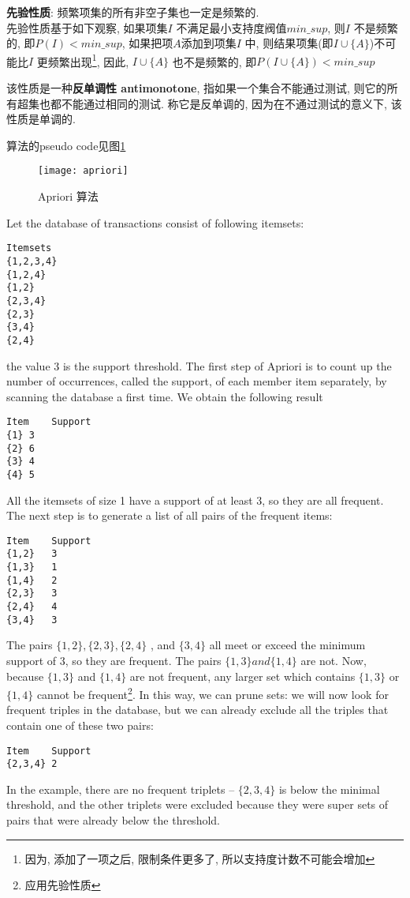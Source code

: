 \documentclass{article}
\begin{document}
\textbf{先验性质}: 频繁项集的所有非空子集也一定是频繁的.\\
先验性质基于如下观察, 如果项集$I$ 不满足最小支持度阀值$min\_sup$, 则$I$ 不是频繁的, 即$P(I) < min\_sup$, 如果把项$A$添加到项集$I$ 中, 则结果项集(即$I \cup \{A\}$)不可能比$I$ 更频繁出现\footnote{因为, 添加了一项之后, 限制条件更多了, 所以支持度计数不可能会增加}, 因此, $I \cup \{A\}$ 也不是频繁的, 即$P(I \cup \{A\}) < min\_sup$

该性质是一种\textbf{反单调性 antimonotone}, 指如果一个集合不能通过测试, 则它的所有超集也都不能通过相同的测试. 称它是反单调的, 因为在不通过测试的意义下, 该性质是单调的.

算法的pseudo code见图\ref{fig.apriori}
\begin{figure}[htbp]
  \centering
  \texttt{[image: apriori]}\\
  \caption{Apriori 算法}\label{fig.apriori}
\end{figure}

\begin{example}
Let the database of transactions consist of following itemsets:
\begin{verbatim}
Itemsets
{1,2,3,4}
{1,2,4}
{1,2}
{2,3,4}
{2,3}
{3,4}
{2,4}
\end{verbatim}
the value 3 is the support threshold.
The first step of Apriori is to count up the number of occurrences, called the support, of each member item separately, by scanning the database a first time.
We obtain the following result
\begin{verbatim}
Item	Support
{1}	3
{2}	6
{3}	4
{4}	5
\end{verbatim}
All the itemsets of size 1 have a support of at least 3, so they are all frequent.
The next step is to generate a list of all pairs of the frequent items:
\begin{verbatim}
Item	Support
{1,2}	3
{1,3}	1
{1,4}	2
{2,3}	3
{2,4}	4
{3,4}	3
\end{verbatim}
The pairs $\{1,2\}, \{2,3\}, \{2,4\}$ , and $\{3,4\}$ all meet or exceed the minimum support of $3$, so they are frequent. The pairs $\{1,3\} and \{1,4\}$ are not. Now, because $\{1,3\}$ and $\{1,4\}$ are not frequent, any larger set which contains $\{1,3\}$ or $\{1,4\}$ cannot be frequent\footnote{应用先验性质}. In this way, we can prune sets: we will now look for frequent triples in the database, but we can already exclude all the triples that contain one of these two pairs:
\begin{verbatim}
Item	Support
{2,3,4}	2
\end{verbatim}
In the example, there are no frequent triplets -- $\{2,3,4\}$ is below the minimal threshold, and the other triplets were excluded because they were super sets of pairs that were already below the threshold.
\end{example}
\end{document}
